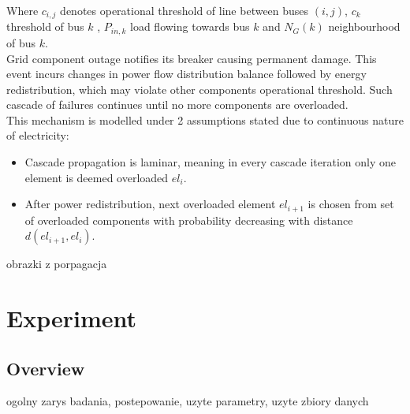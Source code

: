 \documentclass[twoside]{iisthesis}
\begin{document}
Where \(c_{i,j}\)  denotes operational threshold of line between buses \((i,j)\), \(c_k\) threshold of bus \(k\)   , \(P_{in,k}\) load flowing towards bus \(k\) and  \(N_G(k)\)  neighbourhood of bus \(k\).
\\
Grid component outage notifies its breaker causing permanent damage. This event incurs changes in power flow distribution balance followed by energy redistribution, which may violate other components operational threshold. Such cascade of failures continues until no more components are overloaded.
\\
This mechanism is modelled under 2 assumptions stated due to continuous nature of electricity:
\begin{itemize}
	\item Cascade propagation is laminar, meaning in every cascade iteration only one element is deemed overloaded \(el_{i}\).
	\item After power redistribution, next overloaded element \(el_{i+1}\) is chosen from set of overloaded components  with probability decreasing with distance \(d(el_{i+1},el_i)\).  
\end{itemize}

obrazki z porpagacja
\chapter{Experiment}
\section{Overview}
ogolny zarys badania, postepowanie, uzyte parametry, uzyte zbiory danych
\end{document}
